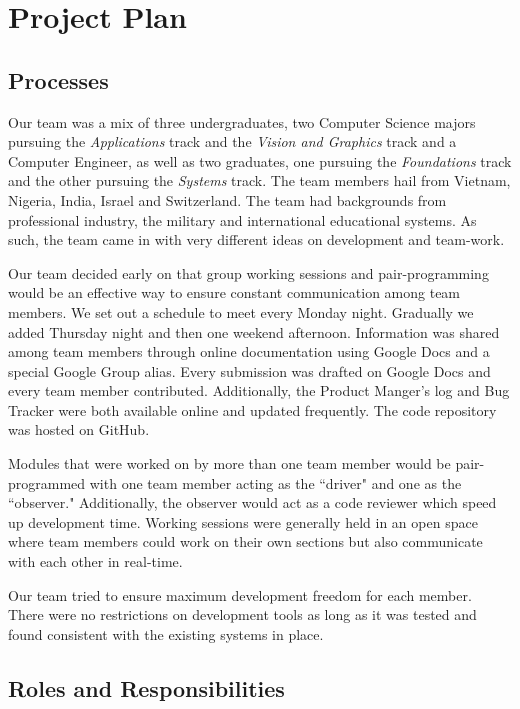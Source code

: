 \documentclass[12pt]{report}
\begin{document}
\chapter{Project Plan}

\section{Processes}

Our team was a mix of three undergraduates, two Computer Science majors pursuing the \textit{Applications} track and the \textit{Vision and Graphics} track and a Computer Engineer, as well as two graduates, one pursuing the \textit{Foundations} track and the other pursuing the \textit{Systems} track. The team members hail from Vietnam, Nigeria, India, Israel and Switzerland. The team had backgrounds from professional industry, the military and international educational systems. As such, the team came in with very different ideas on development and team-work.

Our team decided early on that group working sessions and pair-programming would be an effective way to ensure constant communication among team members. We set out a schedule to meet every Monday night. Gradually we added Thursday night and then one weekend afternoon. Information was shared among team members through online documentation using Google Docs and a special Google Group alias. Every submission was drafted on Google Docs and every team member contributed. Additionally, the Product Manger's log and Bug Tracker were both available online and updated frequently. The code repository was hosted on GitHub. 

Modules that were worked on by more than one team member would be pair-programmed with one team member acting as the ``driver" and one as the ``observer." Additionally, the observer would act as a code reviewer which speed up development time. Working sessions were generally held in an open space where team members could work on their own sections but also communicate with each other in real-time.

Our team tried to ensure maximum development freedom for each member. There were no restrictions on development tools as long as it was tested and found consistent with the existing systems in place. 

\section{Roles and Responsibilities}
\end{document}
